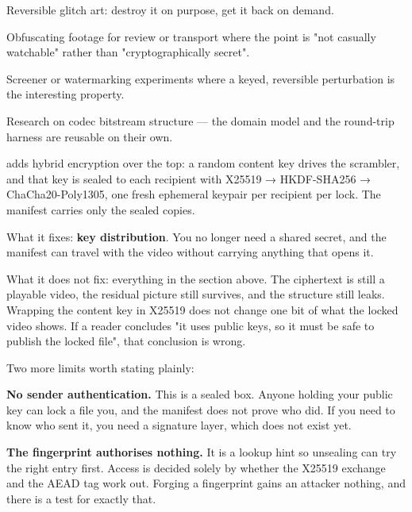 \documentclass[fontpath=fonts/,logopath=logo/]{riposte-doc}
\begin{document}

\begin{ripbullets}
\item Reversible glitch art: destroy it on purpose, get it back on demand.
\item Obfuscating footage for review or transport where the point is "not casually watchable" rather than "cryptographically secret".
\item Screener or watermarking experiments where a keyed, reversible perturbation is the interesting property.
\item Research on codec bitstream structure — the domain model and the round-trip harness are reusable on their own.
\end{ripbullets}



 adds hybrid encryption over the top: a random content key drives the scrambler, and that key is sealed to each recipient with X25519 → HKDF-SHA256 → ChaCha20-Poly1305, one fresh ephemeral keypair per recipient per lock. The manifest carries only the sealed copies.

What it fixes: \textbf{key distribution}. You no longer need a shared secret, and the manifest can travel with the video without carrying anything that opens it.

What it does not fix: everything in the section above. The ciphertext is still a playable video, the residual picture still survives, and the structure still leaks. Wrapping the content key in X25519 does not change one bit of what the locked video shows. If a reader concludes "it uses public keys, so it must be safe to publish the locked file", that conclusion is wrong.

Two more limits worth stating plainly:

\begin{ripbullets}
\item \textbf{No sender authentication.} This is a sealed box. Anyone holding your public key can lock a file  you, and the manifest does not prove who did. If you need to know who sent it, you need a signature layer, which does not exist yet.
\item \textbf{The fingerprint authorises nothing.} It is a lookup hint so unsealing can try the right entry first. Access is decided solely by whether the X25519 exchange and the AEAD tag work out. Forging a fingerprint gains an attacker nothing, and there is a test for exactly that.
\end{ripbullets}
\end{document}
